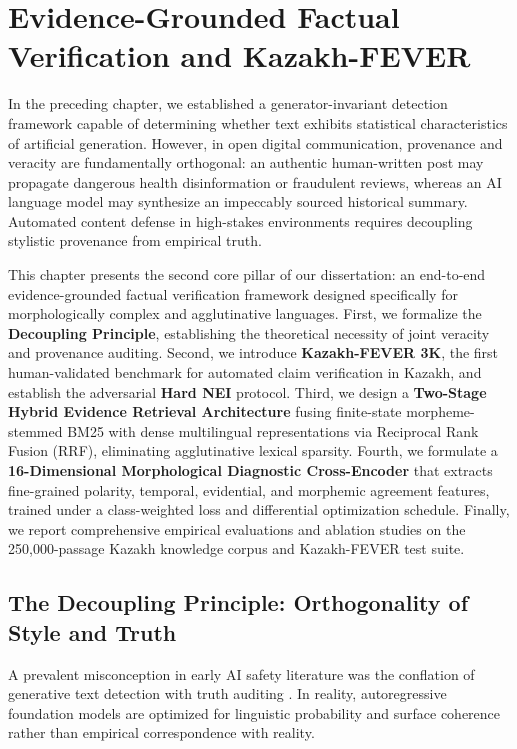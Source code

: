 \chapter{Evidence-Grounded Factual Verification and Kazakh-FEVER}
\label{chap:factual_verification}

In the preceding chapter, we established a generator-invariant detection framework capable of determining whether text exhibits statistical characteristics of artificial generation. However, in open digital communication, provenance and veracity are fundamentally orthogonal: an authentic human-written post may propagate dangerous health disinformation or fraudulent reviews, whereas an AI language model may synthesize an impeccably sourced historical summary. Automated content defense in high-stakes environments requires decoupling stylistic provenance from empirical truth.

This chapter presents the second core pillar of our dissertation: an end-to-end evidence-grounded factual verification framework designed specifically for morphologically complex and agglutinative languages. First, we formalize the \textbf{Decoupling Principle}, establishing the theoretical necessity of joint veracity and provenance auditing. Second, we introduce \textbf{Kazakh-FEVER 3K}, the first human-validated benchmark for automated claim verification in Kazakh, and establish the adversarial \textbf{Hard NEI} protocol. Third, we design a \textbf{Two-Stage Hybrid Evidence Retrieval Architecture} fusing finite-state morpheme-stemmed BM25 with dense multilingual representations via Reciprocal Rank Fusion (RRF), eliminating agglutinative lexical sparsity. Fourth, we formulate a \textbf{16-Dimensional Morphological Diagnostic Cross-Encoder} that extracts fine-grained polarity, temporal, evidential, and morphemic agreement features, trained under a class-weighted loss and differential optimization schedule. Finally, we report comprehensive empirical evaluations and ablation studies on the 250,000-passage Kazakh knowledge corpus and Kazakh-FEVER test suite.

\section{The Decoupling Principle: Orthogonality of Style and Truth}
\label{sec:decoupling_principle}

A prevalent misconception in early AI safety literature was the conflation of generative text detection with truth auditing \citep{sadasivan2023can,wang2024raid}. In reality, autoregressive foundation models are optimized for linguistic probability and surface coherence rather than empirical correspondence with reality. 


